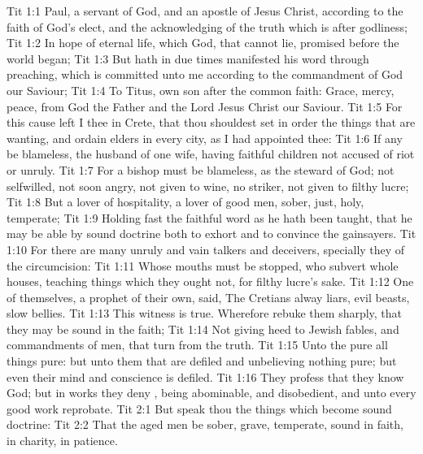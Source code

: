 \vs Tit 1:1 Paul, a servant of God, and an apostle of Jesus Christ, according to the faith of God's elect, and the acknowledging of the truth which is after godliness;
\vs Tit 1:2 In hope of eternal life, which God, that cannot lie, promised before the world began;
\vs Tit 1:3 But hath in due times manifested his word through preaching, which is committed unto me according to the commandment of God our Saviour;
\vs Tit 1:4 To Titus,  own son after the common faith: Grace, mercy,  peace, from God the Father and the Lord Jesus Christ our Saviour.
\vs Tit 1:5 For this cause left I thee in Crete, that thou shouldest set in order the things that are wanting, and ordain elders in every city, as I had appointed thee:
\vs Tit 1:6 If any be blameless, the husband of one wife, having faithful children not accused of riot or unruly.
\vs Tit 1:7 For a bishop must be blameless, as the steward of God; not selfwilled, not soon angry, not given to wine, no striker, not given to filthy lucre;
\vs Tit 1:8 But a lover of hospitality, a lover of good men, sober, just, holy, temperate;
\vs Tit 1:9 Holding fast the faithful word as he hath been taught, that he may be able by sound doctrine both to exhort and to convince the gainsayers.
\vs Tit 1:10 For there are many unruly and vain talkers and deceivers, specially they of the circumcision:
\vs Tit 1:11 Whose mouths must be stopped, who subvert whole houses, teaching things which they ought not, for filthy lucre's sake.
\vs Tit 1:12 One of themselves,  a prophet of their own, said, The Cretians  alway liars, evil beasts, slow bellies.
\vs Tit 1:13 This witness is true. Wherefore rebuke them sharply, that they may be sound in the faith;
\vs Tit 1:14 Not giving heed to Jewish fables, and commandments of men, that turn from the truth.
\vs Tit 1:15 Unto the pure all things  pure: but unto them that are defiled and unbelieving  nothing pure; but even their mind and conscience is defiled.
\vs Tit 1:16 They profess that they know God; but in works they deny , being abominable, and disobedient, and unto every good work reprobate.
\vs Tit 2:1 But speak thou the things which become sound doctrine:
\vs Tit 2:2 That the aged men be sober, grave, temperate, sound in faith, in charity, in patience.
